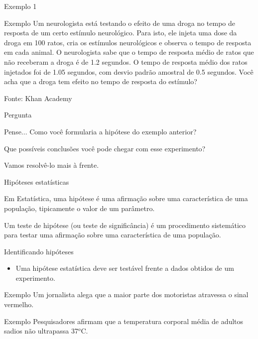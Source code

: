 \documentclass{beamer}
\begin{document}
\begin{frame}[label=exemplo1]{Exemplo 1}
  \begin{exampleblock}{Exemplo}
    Um neurologista está testando o efeito de uma droga no tempo de
    resposta de um certo estímulo neurológico. Para isto, ele injeta
    uma dose da droga em \alert{100} ratos, cria os estímulos
    neurológicos e observa o tempo de resposta em cada animal. O
    neurologista sabe que o tempo de resposta médio de ratos que não
    receberam a droga é de \alert{1.2 segundos}. O tempo de resposta
    médio dos ratos injetados foi de \alert{1.05 segundos}, com desvio
    padrão amostral de \alert{0.5 segundos}. Você acha que a droga tem
    efeito no tempo de resposta do estímulo?
  \end{exampleblock}
Fonte: Khan Academy
\end{frame}

\begin{frame}{Pergunta}
  \begin{block}{Pense...}
    Como você formularia a hipótese do exemplo anterior?

    \bigskip
    Que possíveis conclusões você pode chegar com esse experimento?
  \end{block}

  Vamos resolvê-lo mais à frente.
\end{frame}

\begin{frame}{Hipóteses estatísticas}
  \begin{definition}
    Em Estatística, uma \alert{hipótese} é uma afirmação sobre uma
    característica de uma população, tipicamente o valor de um
    parâmetro.
  \end{definition}
  \begin{definition}
    Um \alert{teste de hipótese} (ou teste de significância) é um
    procedimento sistemático para testar uma afirmação sobre uma
    característica de uma população.
  \end{definition}
\end{frame}

\begin{frame}{Identificando hipóteses}
  \begin{itemize}
  \item Uma hipótese estatística deve ser testável frente a dados
    obtidos de um experimento.
  \end{itemize}
  \begin{exampleblock}{Exemplo}
    Um jornalista alega que a maior parte dos motoristas atravessa o
    sinal vermelho.
  \end{exampleblock}
  \begin{exampleblock}{Exemplo}
    Pesquisadores afirmam que a temperatura corporal média de adultos
    sadios não ultrapassa 37$^o$C.
  \end{exampleblock}
\end{frame}
\end{document}
